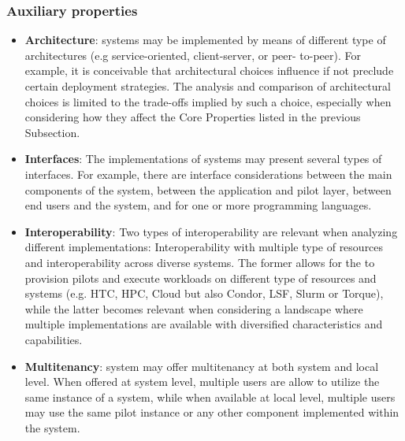 \documentclass{sig-alternate}
\begin{document}
\subsubsection{Auxiliary properties}

\begin{itemize}

\item \textbf{Architecture}: \pilotjob systems may be implemented by
  means of different type of architectures (e.g service-oriented,
  client-server, or peer- to-peer). For example, it is conceivable
  that architectural choices influence if not preclude certain
  deployment strategies. The analysis and comparison of architectural
  choices is limited to the trade-offs implied by such a choice,
  especially when considering how they affect the Core Properties
  listed in the previous Subsection.



\item \textbf{Interfaces}: The implementations of \pilotjob systems
  may present several types of interfaces. For example, there are
  interface considerations between the main components of the
  \pilotjob system, between the application and pilot layer, between
  end users and the \pilotjob system, and for one or more programming
  languages.

\item \textbf{Interoperability}: Two types of interoperability are
  relevant when analyzing different \pilotjob implementations:
  Interoperability with multiple type of resources and
  interoperability across diverse \pilotjob systems. The former allows
  for the \pilotjob to provision pilots and execute workloads on
  different type of resources and systems (e.g. HTC, HPC, Cloud but
  also Condor, LSF, Slurm or Torque), while the latter becomes
  relevant when considering a landscape where multiple \pilotjob
  implementations are available with diversified characteristics and
  capabilities.

\item \textbf{Multitenancy}: \pilotjob system may offer multitenancy
  at both system and local level. When offered at system level,
  multiple users are allow to utilize the same instance of a \pilotjob
  system, while when available at local level, multiple users may use
  the same pilot instance or any other component implemented within the 
  \pilotjob system.


\end{itemize}
\end{document}
